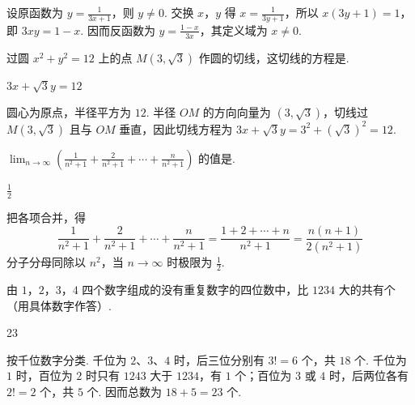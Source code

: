 \documentclass[UTF8,a4paper,oneside,11pt]{ctexbook}
\begin{document}
\begin{solution}
设原函数为 \(y=\frac1{3x+1}\)，则 \(y\neq0\). 交换 \(x\)，\(y\) 得 \(x=\frac1{3y+1}\)，所以 \(x(3y+1)=1\)，即 \(3xy=1-x\). 因而反函数为 \(y=\frac{1-x}{3x}\)，其定义域为 \(x\neq0\).
\end{solution}

\begin{problem}

过圆 \(x^2 + y^2 = 12\) 上的点 \(M(3,\sqrt{3})\) 作圆的切线，这切线的方程是\fillinblank{}.
\end{problem}

\begin{answer}
\(3x + \sqrt{3}y = 12\)
\end{answer}

\begin{solution}
圆心为原点，半径平方为 \(12\). 半径 \(OM\) 的方向向量为 \((3,\sqrt3)\)，切线过 \(M(3,\sqrt3)\) 且与 \(OM\) 垂直，因此切线方程为 \(3x+\sqrt3y=3^2+(\sqrt3)^2=12\).
\end{solution}

\begin{problem}

\(\displaystyle\lim_{n \to \infty}\left(\frac{1}{n^2 + 1} + \frac{2}{n^2 + 1} + \cdots + \frac{n}{n^2 + 1}\right)\) 的值是\fillinblank{}.
\end{problem}

\begin{answer}
\(\frac{1}{2}\)
\end{answer}

\begin{solution}
把各项合并，得
\[
\frac{1}{n^2+1}+\frac{2}{n^2+1}+\cdots+\frac{n}{n^2+1}=\frac{1+2+\cdots+n}{n^2+1}=\frac{n(n+1)}{2(n^2+1)}
\]
分子分母同除以 \(n^2\)，当 \(n\to\infty\) 时极限为 \(\frac12\).
\end{solution}

\begin{problem}

由 \(1\)，\(2\)，\(3\)，\(4\) 四个数字组成的没有重复数字的四位数中，比 \(1234\) 大的共有\fillinblank{}个（用具体数字作答）.
\end{problem}

\begin{answer}
23
\end{answer}

\begin{solution}
按千位数字分类. 千位为 \(2\)、\(3\)、\(4\) 时，后三位分别有 \(3!=6\) 个，共 \(18\) 个. 千位为 \(1\) 时，百位为 \(2\) 时只有 \(1243\) 大于 \(1234\)，有 \(1\) 个；百位为 \(3\) 或 \(4\) 时，后两位各有 \(2!=2\) 个，共 \(5\) 个. 因而总数为 \(18+5=23\) 个.
\end{solution}
\end{document}
